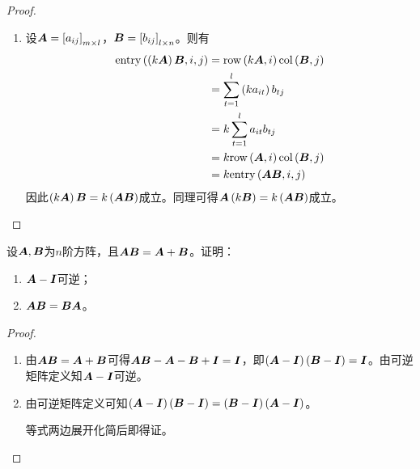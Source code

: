 \begin{proof}
\begin{enumerate}
        \item
              {
              设\(\boldsymbol{A}=\left[ a_{ij} \right]_{m\times l}\)，\(\boldsymbol{B}=\left[ b_{ij} \right]_{l\times n}\)。则有
              \begin{align*}
                  \mathrm{entry}\left( \left( k\boldsymbol{A} \right)\boldsymbol{B},i,j \right) & =\mathrm{row}\left( k\boldsymbol{A},i \right)\mathrm{col}\left( \boldsymbol{B},j \right)     \\
                                                    & =\sum_{t=1}^l\left( ka_{it} \right)b_{tj} \\
                                                    & =k\sum_{t=1}^la_{it}b_{tj}         \\
                                                    & =k\mathrm{row}\left( \boldsymbol{A},i \right)\mathrm{col}\left( \boldsymbol{B},j \right)     \\
                                                    & =k\mathrm{entry}\left( \boldsymbol{A}\boldsymbol{B},i,j \right)
              \end{align*}
              因此\(\left( k\boldsymbol{A} \right)\boldsymbol{B}=k\left( \boldsymbol{A}\boldsymbol{B} \right)\)成立。同理可得\(\boldsymbol{A}\left( k\boldsymbol{B} \right)=k\left( \boldsymbol{A}\boldsymbol{B} \right)\)成立。
              }
    \end{enumerate}
\end{proof}

\begin{suplprob}
    设\(\boldsymbol{A},\boldsymbol{B}\)为\(n\)阶方阵，且\(\boldsymbol{A}\boldsymbol{B}=\boldsymbol{A}+\boldsymbol{B}\)。证明：
    \begin{enumerate}
        \item \(\boldsymbol{A}-\boldsymbol{I}\)可逆；
        \item \(\boldsymbol{A}\boldsymbol{B}=\boldsymbol{B}\boldsymbol{A}\)。
    \end{enumerate}
\end{suplprob}
\begin{proof}
    \begin{enumerate}
        \item
              {
              由\(\boldsymbol{A}\boldsymbol{B}=\boldsymbol{A}+\boldsymbol{B}\)可得\(\boldsymbol{A}\boldsymbol{B}-\boldsymbol{A}-\boldsymbol{B}+\boldsymbol{I}=\boldsymbol{I}\)，即\(\left( \boldsymbol{A}-\boldsymbol{I} \right)\left( \boldsymbol{B}-\boldsymbol{I} \right)=\boldsymbol{I}\)。由可逆矩阵定义知\(\boldsymbol{A}-\boldsymbol{I}\)可逆。
              }
        \item
              {
              由可逆矩阵定义可知\(\left( \boldsymbol{A}-\boldsymbol{I} \right)\left( \boldsymbol{B}-\boldsymbol{I} \right)=\left( \boldsymbol{B}-\boldsymbol{I} \right)\left( \boldsymbol{A}-\boldsymbol{I} \right)\)。

              等式两边展开化简后即得证。
              }
    \end{enumerate}
\end{proof}

